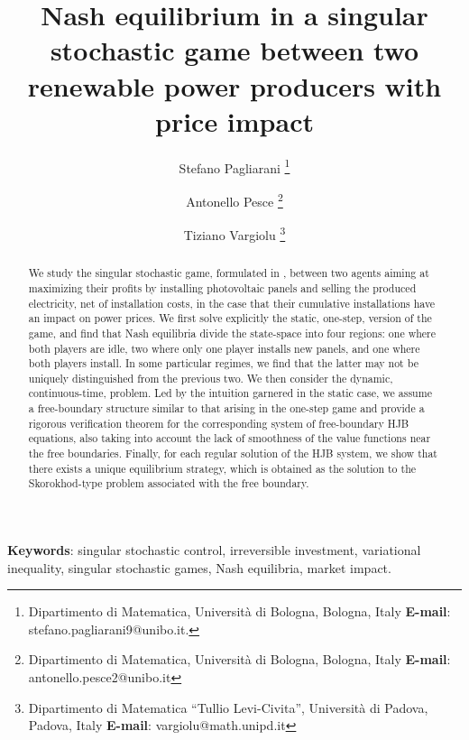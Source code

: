 \documentclass[10pt]{article}
\numberwithin{equation}{section}
\theoremstyle{plain}
\numberwithin{theorem}{section}
\theoremstyle{definition}
\newcommand{\<}{\langle}
\renewcommand{\>}{\rangle}
\renewcommand{\(}{\left(}
\renewcommand{\)}{\right)}
\begin{document}
\title{Nash equilibrium in a singular stochastic game between two renewable power producers with price impact}

\author{Stefano Pagliarani
\thanks{Dipartimento di Matematica, Universit\`a di Bologna, Bologna, Italy
  \textbf{E-mail}: stefano.pagliarani9@unibo.it.} 
  \and Antonello Pesce
\thanks{Dipartimento di Matematica, Universit\`a di Bologna, Bologna, Italy
  \textbf{E-mail}: antonello.pesce2@unibo.it} 
  \and Tiziano Vargiolu
\thanks{Dipartimento di Matematica ``Tullio Levi-Civita”, Universit\`a di Padova, Padova, Italy
\textbf{E-mail}: vargiolu@math.unipd.it}}


\date{}

\maketitle

\begin{abstract}
We study the singular stochastic game, formulated in \cite{MR4352705}, 
between two agents aiming at maximizing their profits by installing photovoltaic panels and selling the produced electricity, net of installation costs, in the case that their cumulative installations have an impact on power prices. We first solve explicitly the static, one-step, version of the game, and find that Nash equilibria divide the state-space into four regions: one where both players are idle, two where only one player installs new panels, and one where both players install. In some particular regimes, we find that the latter may not be uniquely distinguished from the previous two. 
We then consider the dynamic, continuous-time, problem. Led by the intuition garnered in the static case, we assume a free-boundary structure similar to that arising in the one-step game and provide a rigorous verification theorem for the corresponding system of free-boundary HJB equations, also taking into account the lack of smoothness of the value functions near the free boundaries. 
Finally, for each regular solution of the HJB system, we show that there exists a unique equilibrium strategy, which is obtained as the solution to the Skorokhod-type problem associated with the free boundary.
\end{abstract}


\noindent \textbf{Keywords}:  singular stochastic control, irreversible investment, variational
inequality, singular stochastic games, Nash equilibria, market impact.\\ \noindent
\end{document}
